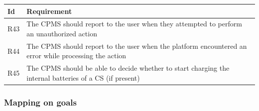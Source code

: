 \documentclass[11pt]{article}
\begin{document}
\begin{table}[H]
    \centering
    \setlength{\tabcolsep}{18pt}
    \renewcommand{\arraystretch}{1.2}
    \begin{tabularx}{\textwidth}{|>{\centering\hsize=0.1\hsize}X|>{\hsize=1.9\hsize}X|}
        \hline
        \textbf{Id} & \textbf{Requirement} \\
        \hline
        R43 & The CPMS should report to the user when they attempted to perform an unauthorized action \\
        \hline
        R44 & The CPMS should report to the user when the platform encountered an error while processing the action \\
        \hline
        R45 & The CPMS should be able to decide whether to start charging the internal batteries of a CS (if present) \\
        \hline
    \end{tabularx}
    \label{tab:requirements-2}
\end{table}

\subsubsection{Mapping on goals}
\end{document}
